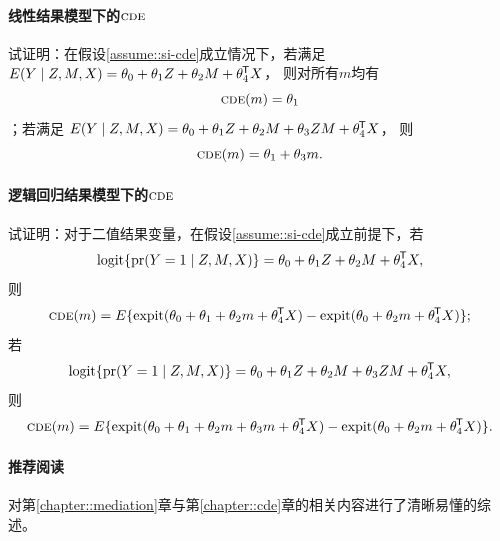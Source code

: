   
  \paragraph{线性结果模型下的$\textsc{cde}$}\label{problem::cde-linear}
  
  试证明：在假设\ref{assume::si-cde}成立情况下，若满足
$E(Y\mid Z, M, X ) = \theta_0 + \theta_1 Z + \theta_2 M +   \theta_4^{\mkern-1.5mu\mathsf{T}} X$，
则对所有$m$均有
$$
  \textsc{cde} (m) = \theta_1
  $$
；若满足
$E(Y\mid Z, M, X ) = \theta_0 + \theta_1 Z + \theta_2 M + \theta_3 ZM +    \theta_4^{\mkern-1.5mu\mathsf{T}} X$，
则
$$
\textsc{cde}(m) =   \theta_1 + \theta_3 m. 
  $$
  
  
    \paragraph{逻辑回归结果模型下的$\textsc{cde}$}\label{problem::cde-logit}
  
  试证明：对于二值结果变量，在假设\ref{assume::si-cde}成立前提下，若
$$
  \textup{logit} \{ \textup{pr}(Y = 1\mid Z, M, X ) \} = \theta_0 + \theta_1 Z + \theta_2 M +   \theta_4^{\mkern-1.5mu\mathsf{T}} X ,
  $$ 
则
$$
  \textsc{cde} (m) = E\{ \textup{expit}( \theta_0 + \theta_1  + \theta_2 m +   \theta_4^{\mkern-1.5mu\mathsf{T}} X ) - \textup{expit}( \theta_0    + \theta_2 m +   \theta_4^{\mkern-1.5mu\mathsf{T}} X ) \} ; 
  $$
若
$$
  \textup{logit} \{ \textup{pr}(Y = 1\mid Z, M, X ) \} = \theta_0 + \theta_1 Z + \theta_2 M + \theta_3 ZM +    \theta_4^{\mkern-1.5mu\mathsf{T}} X,
  $$ 
则
$$
\textsc{cde}(m) =  E\{ \textup{expit}( \theta_0 + \theta_1  + \theta_2 m  +\theta_3 m +   \theta_4^{\mkern-1.5mu\mathsf{T}} X ) - \textup{expit}( \theta_0    + \theta_2 m +   \theta_4^{\mkern-1.5mu\mathsf{T}} X ) \}.
  $$
  
  
  
  \paragraph{推荐阅读} 

\citet{nguyen2020clarifying}对第\ref{chapter::mediation}章与第\ref{chapter::cde}章的相关内容进行了清晰易懂的综述。 

